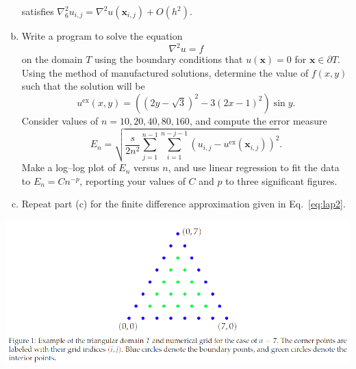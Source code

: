 \documentclass{article}
\newcommand{\p}{\partial}
\renewcommand{\vec}[1]{\mathbf{#1}}
\newcommand{\vx}{\vec{x}}
\begin{document}
\begin{problem}
\begin{enumerate}[(a)]
                satisfies $\nabla^2_6u_{i,j} = \nabla^2 u(\vx_{i,j}) + O(h^2)$.
          \item Write a program to solve the equation
                \begin{equation}
                  \nabla^2 u = f
                \end{equation}
                on the domain $T$ using the boundary conditions that $u(\vx)=0$ for
                $\vx\in \p T$. Using the method of manufactured solutions, determine
                the value of $f(x,y)$ such that the solution will be
                \begin{equation}
                  u^{\text{ex}}(x,y) = \left( (2y-\sqrt{3})^2- 3(2x-1)^2 \right) \sin y.
                \end{equation}
                Consider values of $n=10,20,40,80,160$, and compute the error measure
                \begin{equation}
                  E_n = \sqrt{\frac{s}{2n^2} \sum_{j=1}^{n-1} \sum_{i=1}^{n-j-1} (u_{i,j}-u^{\text{ex}}(\vx_{i,j}))^2}.
                \end{equation}
                Make a log--log plot of $E_n$ versus $n$, and use linear regression to
                fit the data to $E_n = C n^{-p}$, reporting your values of $C$ and $p$ to
                three significant figures.
          \item Repeat part (c) for the finite difference approximation given in Eq.~\eqref{eq:lap2}.
        \end{enumerate}
        \begin{center}
          \includegraphics[width=1.0\textwidth]{tri.png}
        \end{center}
\end{problem}
\end{document}

